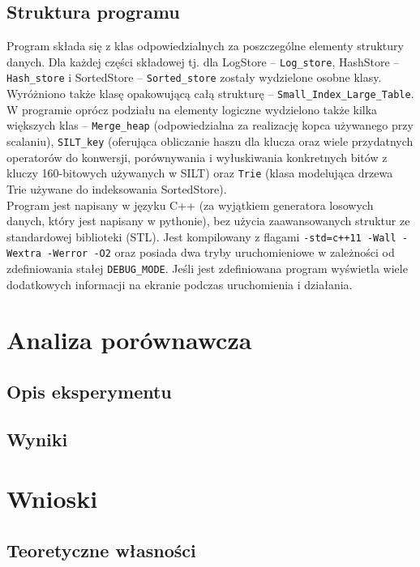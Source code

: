 \documentclass[declaration,shortabstract,masc]{iithesis}
\begin{document}
		\section{Struktura programu}
			Program składa się z klas odpowiedzialnych za poszczególne elementy struktury danych. Dla każdej części składowej tj. dla LogStore -- \texttt{Log\_store}, HashStore -- \texttt{Hash\_store} i SortedStore -- \texttt{Sorted\_store} zostały wydzielone osobne klasy. Wyróżniono także klasę opakowującą całą strukturę -- \texttt{Small\_Index\_Large\_Table}.\\
			\indent W programie oprócz podziału na elementy logiczne wydzielono także kilka większych klas -- \texttt{Merge\_heap} (odpowiedzialna za realizację kopca używanego przy scalaniu), \texttt{SILT\_key} (oferująca obliczanie haszu dla klucza oraz wiele przydatnych operatorów do konwersji, porównywania i wyłuskiwania konkretnych bitów z kluczy 160-bitowych używanych w SILT) oraz \texttt{Trie} (klasa modelująca drzewa Trie używane do indeksowania SortedStore).\\
			\indent Program jest napisany w języku C++ (za wyjątkiem generatora losowych danych, który jest napisany w pythonie), bez użycia zaawansowanych struktur ze standardowej biblioteki (STL). Jest kompilowany z flagami \texttt{-std=c++11 -Wall -Wextra -Werror -O2} oraz posiada dwa tryby uruchomieniowe w zależności od zdefiniowania stałej \texttt{DEBUG\_MODE}. Jeśli jest zdefiniowana program wyświetla wiele dodatkowych informacji na ekranie podczas uruchomienia i działania.
	\chapter{Analiza porównawcza}
		\section{Opis eksperymentu}
		\section{Wyniki}
	\chapter{Wnioski}
		\section{Teoretyczne własności}
\end{document}
